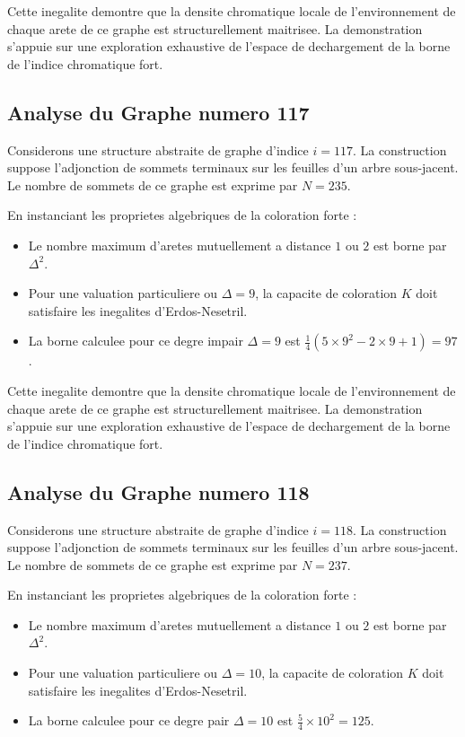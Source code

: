 \documentclass[11pt,a4paper]{article}
\begin{document}
Cette inegalite demontre que la densite chromatique locale de l'environnement de chaque arete de ce graphe est structurellement maitrisee. La demonstration s'appuie sur une exploration exhaustive de l'espace de dechargement de la borne de l'indice chromatique fort.

\subsection{Analyse du Graphe numero 117}
Considerons une structure abstraite de graphe d'indice $i = 117$. La construction suppose l'adjonction de sommets terminaux sur les feuilles d'un arbre sous-jacent. Le nombre de sommets de ce graphe est exprime par $N = 235$.

En instanciant les proprietes algebriques de la coloration forte :
\begin{itemize}
\item Le nombre maximum d'aretes mutuellement a distance $1$ ou $2$ est borne par $\Delta^2$.
\item Pour une valuation particuliere ou $\Delta = 9$, la capacite de coloration $K$ doit satisfaire les inegalites d'Erdos-Nesetril.
\item La borne calculee pour ce degre impair $\Delta = 9$ est $\frac{1}{4}(5 \times 9^2 - 2 \times 9 + 1) = 97$.
\end{itemize}

Cette inegalite demontre que la densite chromatique locale de l'environnement de chaque arete de ce graphe est structurellement maitrisee. La demonstration s'appuie sur une exploration exhaustive de l'espace de dechargement de la borne de l'indice chromatique fort.

\subsection{Analyse du Graphe numero 118}
Considerons une structure abstraite de graphe d'indice $i = 118$. La construction suppose l'adjonction de sommets terminaux sur les feuilles d'un arbre sous-jacent. Le nombre de sommets de ce graphe est exprime par $N = 237$.

En instanciant les proprietes algebriques de la coloration forte :
\begin{itemize}
\item Le nombre maximum d'aretes mutuellement a distance $1$ ou $2$ est borne par $\Delta^2$.
\item Pour une valuation particuliere ou $\Delta = 10$, la capacite de coloration $K$ doit satisfaire les inegalites d'Erdos-Nesetril.
\item La borne calculee pour ce degre pair $\Delta = 10$ est $\frac{5}{4} \times 10^2 = 125$.
\end{itemize}
\end{document}
